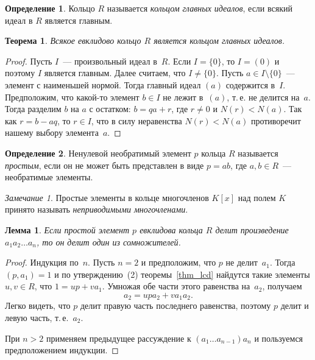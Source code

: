 \documentclass[a4paper,10pt]{amsart}
\newtheorem{theorem}{Теорема}
\newtheorem{lemma}{Лемма}
\theoremstyle{definition}
\newtheorem{definition}{Определение}
\theoremstyle{remark}
\newtheorem{remark}{Замечание}
\begin{document}
\begin{definition}
Кольцо $R$ называется \textit{кольцом главных идеалов}, если всякий
идеал в $R$ является главным.
\end{definition}

\begin{theorem} \label{thm_er_rpi}
Всякое евклидово кольцо $R$ является кольцом главных идеалов.
\end{theorem}

\begin{proof}
Пусть $I$~--- произвольный идеал в~$R$. Если $I = \lbrace 0
\rbrace$, то $I = (0)$ и поэтому $I$ является главным. Далее
считаем, что $I \ne \lbrace 0 \rbrace$. Пусть $a \in I \setminus
\lbrace 0 \rbrace$~--- элемент с наименьшей нормой. Тогда главный
идеал $(a)$ содержится в~$I$. Предположим, что какой-то элемент $b
\in I$ не лежит в~$(a)$, т.\,е. не делится на~$a$. Тогда разделим
$b$ на $a$ с остатком: $b = qa + r$, где $r \ne 0$ и $N(r) < N(a)$.
Так как $r = b - aq$, то $r \in I$, что в силу неравенства $N(r) <
N(a)$ противоречит нашему выбору элемента~$a$.
\end{proof}

\begin{definition}
Ненулевой необратимый элемент $p$ кольца $R$ называется {\it
простым}, если он не может быть представлен в виде $p = a b$, где
$a, b \in R$~--- необратимые элементы.
\end{definition}

\begin{remark}
Простые элементы в кольце многочленов $K[x]$ над полем $K$ принято
называть {\it неприводимыми многочленами}.
\end{remark}

\begin{lemma} \label{ll}
Если простой элемент $p$ евклидова кольца $R$ делит произведение
$a_1a_2\ldots a_n$, то он делит один из сомножителей.
\end{lemma}

\begin{proof}
Индукция по~$n$. Пусть $n=2$ и предположим, что $p$ не делит~$a_1$.
Тогда $(p, a_1) = 1$ и по утверждению~(2) теоремы~\ref{thm_lcd}
найдутся такие элементы $u, v \in R$, что $1 = up + v a_1$. Умножая
обе части этого равенства на~$a_2$, получаем
$$
a_2 = upa_2 + v a_1a_2.
$$
Легко видеть, что $p$ делит правую часть последнего равенства,
поэтому $p$ делит и левую часть, т.\,е.~$a_2$.

При $n > 2$ применяем предыдущее рассуждение к $(a_1 \ldots
a_{n-1})a_n$ и пользуемся предположением индукции.
\end{proof}
\end{document}
